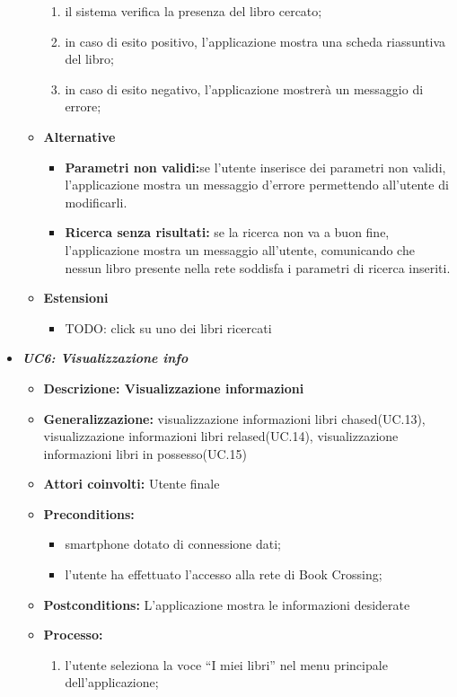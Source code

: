 \begin{itemize}
\begin{itemize}
\begin{enumerate}
			 
			\item il sistema verifica la presenza del libro cercato;
			\item in caso di esito positivo, l’applicazione mostra una scheda riassuntiva del libro;
			\item in caso di esito negativo, l’applicazione mostrerà un messaggio di errore;
		\end{enumerate}
		\item \textbf{Alternative}
		\begin{itemize}
			\item \textbf{Parametri non validi:}se l'utente inserisce dei parametri non validi, l'applicazione mostra un messaggio d'errore permettendo all'utente di modificarli.
			\item \textbf{Ricerca senza risultati:} se la ricerca non va a buon fine, l'applicazione mostra un messaggio all'utente, comunicando che nessun libro presente nella rete soddisfa i parametri di ricerca inseriti.
		\end{itemize}
		\item \textbf{Estensioni}
		\begin{itemize}
			\item TODO: click su uno dei libri ricercati
		\end{itemize}
	\end{itemize}
	\item \textbf{\textit{UC6: Visualizzazione info}}
	\begin{itemize}
		\item \textbf{Descrizione: Visualizzazione informazioni}
		\item \textbf{Generalizzazione:} visualizzazione informazioni libri chased(UC.13), visualizzazione informazioni libri relased(UC.14), visualizzazione informazioni libri in possesso(UC.15)
		\item \textbf{Attori coinvolti:} Utente finale
		\item \textbf{Preconditions:}
		\begin{itemize}
			\item smartphone dotato di connessione dati;
			\item l’utente ha effettuato l’accesso alla rete di Book Crossing;
		\end{itemize}
		\item \textbf{Postconditions:} L’applicazione mostra le informazioni desiderate
		\item \textbf{Processo:}
		\begin{enumerate}
			\item l’utente seleziona la voce “I miei libri” nel menu principale dell’applicazione;

\end{enumerate}
\end{itemize}
\end{itemize}
